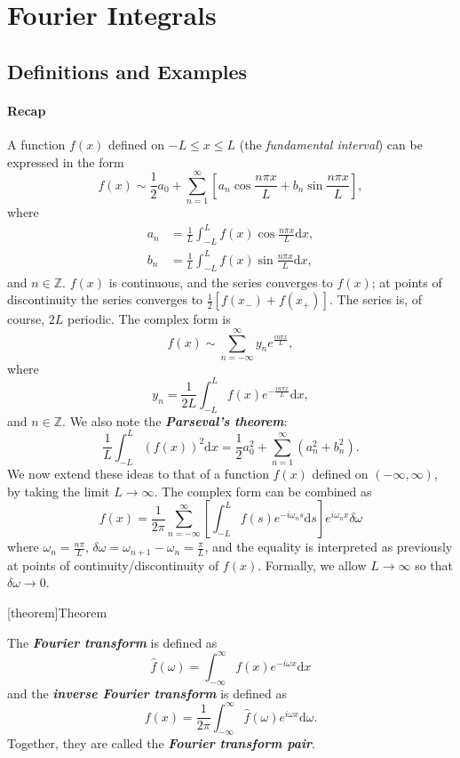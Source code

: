 \documentclass[12pt]{report}
\theoremstyle{definition}
\begin{document}
\section{Fourier Integrals}

\subsection{Definitions and Examples}

\paragraph{Recap}

A function $f(x)$ defined on $-L\le x \le L$ (the \emph{fundamental interval})
can be expressed in the form\[
    f(x) \sim \frac{1}{2}a_0 + \sum_{n=1}^{\infty} \left[a_n\cos{\frac{n\pi x}{L}}
        + b_n\sin{\frac{n\pi x}{L}}\right],
\]where\[
    \begin{align*}
        a_n & = \frac{1}{L}\int_{-L}^{L} f(x)\cos{\frac{n\pi x}{L}}\mathrm{d}x, \\
        b_n & = \frac{1}{L}\int_{-L}^{L} f(x)\sin{\frac{n\pi x}{L}}\mathrm{d}x,
    \end{align*}
\]and $n \in \mathbb{Z}$. $f(x)$ is continuous, and the series converges to $f(x)$;
at points of discontinuity the series converges to $\frac{1}{2}[f(x_-) + f(x_+)]$.
The series is, of course, $2L$ periodic. The complex form is\[
    f(x) \sim \sum_{n=-\infty}^{\infty}y_n e^{\frac{in\pi x}{L}},
\]where\[
y_n = \frac{1}{2L}\int_{-L}^{L} f(x) e^{-\frac{in\pi x}{L}}\mathrm{d}x,
\]and $n \in \mathbb{Z}$.
We also note the \textbf{\emph{Parseval's theorem}}:\[
    \frac{1}{L}\int_{-L}^{L} {\left(f(x)\right)}^{2}\mathrm{d}x
    = \frac{1}{2}a_0^{2} + \sum_{n=1}^{\infty} (a_n^{2} + b_n^{2}).
\]
We now extend these ideas to that of a function $f(x)$ defined on $(-\infty, \infty)$,
by taking the limit $L\rightarrow{}\infty$.
The complex form can be combined as\[
    f(x) = \frac{1}{2\pi}\sum_{n=-\infty}^{\infty}\left[\int_{-L}^{L} f(s)e^{-i\omega_n s}\mathrm{d}s\right]
    e^{i\omega_n x}\delta\omega
\]where $\omega_n = \frac{n\pi}{L}$, $\delta\omega = \omega_{n+1}-\omega_n = \frac{\pi}{L}$,
and the equality is interpreted as previously at points of continuity/discontinuity of $f(x)$.
Formally, we allow $L\rightarrow{}\infty$ so that $\delta\omega\rightarrow{}0$.

[theorem]{Theorem}
\begin{fourier tranform}
    The \textbf{\emph{Fourier transform}} is defined as\[
        \hat{f}(\omega) = \int_{-\infty}^{\infty} f(x)e^{-i\omega x}\mathrm{d}x
    \]and the \textbf{\emph{inverse Fourier transform}} is defined as\[
        f(x) = \frac{1}{2\pi}\int_{-\infty}^{\infty} \hat{f}(\omega) e^{i\omega x}\mathrm{d}\omega.
    \]
    Together, they are called the \textbf{\emph{Fourier transform pair}}.
\end{fourier tranform}
\end{document}

